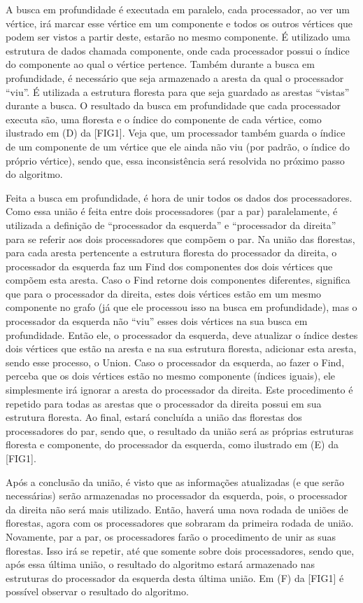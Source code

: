 \documentclass[12pt]{article}
\begin{document}
A busca em profundidade é executada em paralelo, cada processador, ao ver um vértice, irá marcar esse vértice em um componente e todos os outros vértices que podem ser vistos a partir deste, estarão no mesmo componente. É utilizado uma estrutura de dados chamada componente, onde cada processador possui o índice do componente ao qual o vértice pertence. Também durante a busca em profundidade, é necessário que seja armazenado a aresta da qual o processador “viu”. É utilizada a estrutura floresta para que seja guardado as arestas “vistas” durante a busca. O resultado da busca em profundidade que cada processador executa são, uma floresta e o índice do componente de cada vértice, como ilustrado em (D) da [FIG1]. Veja que, um processador também guarda o índice de um componente de um vértice que ele ainda não viu (por padrão, o índice do próprio vértice), sendo que, essa inconsistência será resolvida no próximo passo do algoritmo.

Feita a busca em profundidade, é hora de unir todos os dados dos processadores. Como essa união é feita entre dois processadores (par a par) paralelamente, é utilizada a definição de “processador da esquerda” e “processador da direita” para se referir aos dois processadores que compõem o par. Na união das florestas, para cada aresta pertencente a estrutura floresta do processador da direita, o processador da esquerda faz um Find dos componentes dos dois vértices que compõem esta aresta. Caso o Find retorne dois componentes diferentes, significa que para o processador da direita, estes dois vértices estão em um mesmo componente no grafo (já que ele processou isso na busca em profundidade), mas o processador da esquerda não “viu” esses dois vértices na sua busca em profundidade. Então ele, o processador da esquerda, deve atualizar o índice destes dois vértices que estão na aresta e na sua estrutura floresta, adicionar esta aresta, sendo esse processo, o Union. Caso o processador da esquerda, ao fazer o Find, perceba que os dois vértices estão no mesmo componente (índices iguais), ele simplesmente irá ignorar a aresta do processador da direita. Este procedimento é repetido para todas as arestas que o processador da direita possui em sua estrutura floresta. Ao final, estará concluída a união das florestas dos processadores do par, sendo que, o resultado da união será as próprias estruturas floresta e componente, do processador da esquerda, como ilustrado em (E) da [FIG1].

Após a conclusão da união, é visto que as informações atualizadas (e que serão necessárias) serão armazenadas no processador da esquerda, pois, o processador da direita não será mais utilizado. Então, haverá uma nova rodada de uniões de florestas, agora com os processadores que sobraram da primeira rodada de união. Novamente, par a par, os processadores farão o procedimento de unir as suas florestas. Isso irá se repetir, até que somente sobre dois processadores, sendo que, após essa última união, o resultado do algoritmo estará armazenado nas estruturas do processador da esquerda desta última união. Em (F) da [FIG1] é possível observar o resultado do algoritmo.
\end{document}
